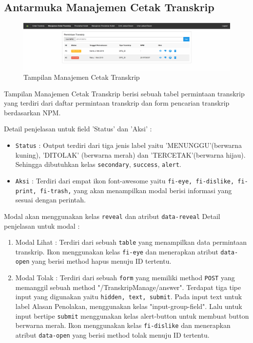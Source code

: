 \documentclass[a4paper,twoside]{article}
\begin{document}
\begin{enumerate}
		\subsection{Antarmuka Manajemen Cetak Transkrip}
		\begin{figure} [H]
			\centering  
			\includegraphics[scale=0.5]{Tampilan-Manajemen-Cetak-Transkrip.png}  
			\caption{Tampilan Manajemen Cetak Transkrip} 	
		\end{figure}
		
		Tampilan Manajemen Cetak Transkrip berisi sebuah tabel permintaan transkrip yang terdiri dari daftar permintaan transkrip dan form pencarian transkrip berdasarkan NPM. \par
		
		\noindent Detail penjelasan untuk field 'Status' dan 'Aksi' :
		\begin{itemize}
			\item \texttt{Status} : Output terdiri dari tiga jenis label yaitu 'MENUNGGU'(berwarna kuning), 'DITOLAK' (berwarna merah) dan 'TERCETAK'(berwarna hijau).  Sehingga dibutuhkan kelas \verb|secondary|, \verb|success|, \verb|alert|. 
			\item \texttt{Aksi} : Terdiri dari empat ikon font-awesome yaitu \verb|fi-eye, fi-dislike, fi-print, fi-trash,| yang akan menampilkan modal berisi informasi yang sesuai dengan perintah.
		\end{itemize}
		Modal akan menggunakan kelas \texttt{reveal} dan atribut \texttt{data-reveal} Detail penjelasan untuk modal : 
		
		\begin{enumerate}
			
			\item Modal Lihat : Terdiri dari sebuah \texttt{table} yang menampilkan data permintaan transkrip. Ikon menggunakan kelas \texttt{fi-eye} dan menerapkan atribut \texttt{data-open} yang berisi method hapus menuju ID tertentu.
			
			\item Modal Tolak : Terdiri dari sebuah \texttt{form} yang memiliki method \texttt{POST} yang memanggil sebuah method "/TranskripManage/answer". Terdapat tiga tipe input yang digunakan yaitu \texttt{hidden, text, submit}. Pada input text untuk label Alasan Penolakan, menggunakan kelas "input-group-field". Lalu untuk input bertipe \texttt{submit} menggunakan kelas alert-button untuk membuat button berwarna merah. Ikon menggunakan kelas \texttt{fi-dislike} dan menerapkan atribut \texttt{data-open} yang berisi method tolak menuju ID tertentu.
			

\end{enumerate}
\end{enumerate}
\end{document}
